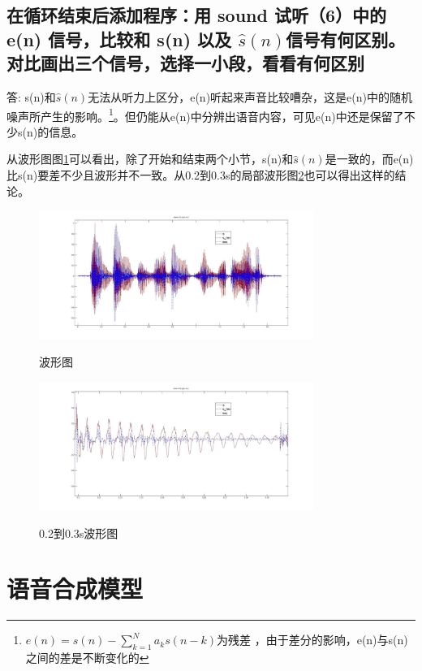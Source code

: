 \documentclass{ctexart}
\begin{document}
\subsection{
    在循环结束后添加程序：用 sound 试听（6）中的 e(n) 信号，比较和 s(n) 以及 
$\hat{s}(n)$信号有何区别。对比画出三个信号，选择一小段，看看有何区别}

答:
s(n)和$\hat{s}(n)$无法从听力上区分，e(n)听起来声音比较嘈杂，这是e(n)中的随机噪声所产生的影响。\footnote{$e(n)=s(n)-\sum_{k=1}^{N}a_ks(n-k)$为残差
，由于差分的影响，e(n)与s(n)之间的差是不断变化的}。但仍能从e(n)中分辨出语音内容，可见e(n)中还是保留了不少s(n)的信息。

从波形图图\ref{6wave}可以看出，除了开始和结束两个小节，s(n)和$\hat{s}(n)$是一致的，而e(n)比s(n)要差不少且波形并不一致。从0.2到0.3s的局部波形图\ref{6detail}也可以得出这样的结论。
\begin{figure}
    \centering
    \includegraphics[width=0.8\textwidth]{6_wave.jpg}\\
    \caption{波形图\label{6wave}}
\end{figure}


\begin{figure}
    \centering
    \includegraphics[width=0.8\textwidth]{6_detail.jpg}\\
    \caption{0.2到0.3s波形图\label{6detail}}
\end{figure}


\section{
语音合成模型
}
\setcounter{subsection}{6} 
\end{document}
